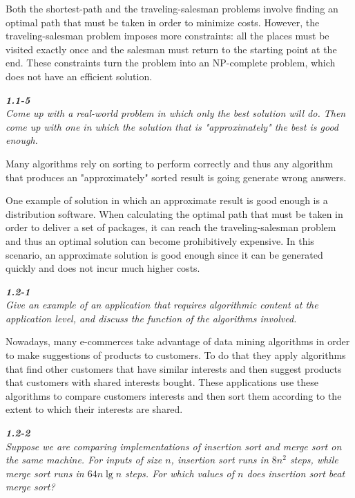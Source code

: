 \documentclass[8pt,a4paper]{article}
\begin{document}
Both the shortest-path and the traveling-salesman problems involve finding
an optimal path that must be taken in order to minimize costs. However, the
traveling-salesman problem imposes more constraints: all the places must be
visited exactly once and the salesman must return to the starting point at
the end. These constraints turn the problem into an NP-complete problem, which
does not have an efficient solution.

\begin{framed}
\textbf{\textit{1.1-5}} \\
\textit{Come up with a real-world problem in which only the best solution will
do. Then come up with one in which the solution that is "approximately" the best
is good enough.}
\end{framed}

Many algorithms rely on sorting to perform correctly and thus any algorithm
that produces an "approximately" sorted result is going generate wrong answers.

One example of solution in which an approximate result is good enough is a
distribution software. When calculating the optimal path that must be taken
in order to deliver a set of packages, it can reach the traveling-salesman
problem and thus an optimal solution can become prohibitively expensive.
In this scenario, an approximate solution is good enough since it can be
generated quickly and does not incur much higher costs.

\begin{framed}
\textbf{\textit{1.2-1}} \\
\textit{Give an example of an application that requires algorithmic content at the
application level, and discuss the function of the algorithms involved.}
\end{framed}

Nowadays, many e-commerces take advantage of data mining algorithms in order to
make suggestions of products to customers. To do that they apply algorithms
that find other customers that have similar interests and then suggest products
that customers with shared interests bought. These applications use these
algorithms to compare customers interests and then sort them according to the
extent to which their interests are shared.

\begin{framed}
\textbf{\textit{1.2-2}} \\
\textit{Suppose we are comparing implementations of insertion sort and merge sort
on the same machine. For inputs of size $n$, insertion sort runs in $8n^{2}$ steps,
while merge sort runs in $64n \lg n$ steps. For which values of $n$ does insertion
sort beat merge sort?}
\end{framed}
\end{document}
